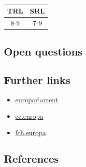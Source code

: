 \documentclass[
]{book}
\providecommand{\tightlist}{%
  \setlength{\itemsep}{0pt}\setlength{\parskip}{0pt}}
\begin{document}
\begin{longtable}[]{@{}cc@{}}
\toprule
TRL & SRL\tabularnewline
\midrule
\endhead
8-9 & 7-9\tabularnewline
\bottomrule
\end{longtable}

\hypertarget{open-questions-10}{%
\subsection*{Open questions}\label{open-questions-10}}

\hypertarget{further-links-6}{%
\subsection*{Further links}\label{further-links-6}}

\begin{itemize}
\tightlist
\item
  \href{https://www.europarl.europa.eu/news/nl/press-room/20180911IPR13114/more-electric-cars-on-eu-roads-by-2030}{europarlament}
\item
  \href{https://ec.europa.eu/transport/themes/urban/vehicles/road/hydrogen_en}{ec.europa}
\item
  \href{https://www.fch.europa.eu/news/hydrogen-roadmap-europe-sustainable-pathway-european-energy-transition}{fch.europa}
\end{itemize}

\hypertarget{references-10}{%
\subsection*{References}\label{references-10}}
\end{document}

